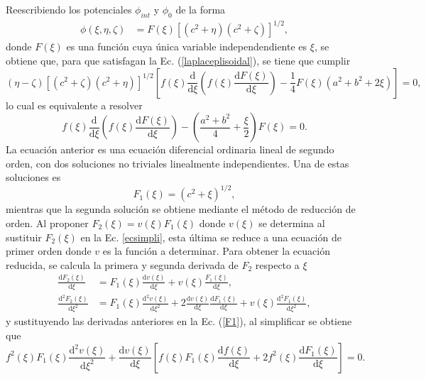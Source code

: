 Reescribiendo los potenciales $\phi_{int}$ y $\phi_0$ de la forma
\begin{align}
    \phi(\xi,\eta,\zeta)&=F(\xi)[(c^2+\eta)(c^2+\zeta)]^{1/2}, 
    \label{phi0 con F}
\end{align}
donde $F(\xi)$ es una función cuya única variable independendiente es $\xi$, se obtiene que, para que satisfagan la Ec. (\ref{laplaceplisoidal}), se tiene que cumplir 
\begin{equation}
  (\eta-\zeta)[(c^2+\zeta)(c^2+\eta)]^{1/2}\left[f(\xi)\frac{\text{d}}{\text{d}\xi}\left(f(\xi)\frac{ \text{d} F(\xi)}{\text{d}\xi}\right)-\frac{1}{4}F(\xi)(a^2+b^2+2\xi)\right]=0,
\end{equation}
lo cual es equivalente a resolver
\begin{equation}
    f(\xi)\frac{\text{d}}{\text{d}\xi}\left(f(\xi)\frac{ \text{d} F(\xi)}{\text{d}\xi}\right)-\left(\frac{a^2+b^2}{4}+\frac{\xi}{2}\right)F(\xi)=0.
    \label{ecsimpli}
\end{equation}
La ecuación anterior es una ecuación diferencial ordinaria lineal de segundo orden, con dos soluciones no triviales linealmente independientes. Una de estas soluciones es \cite{Bohren}
\begin{equation}
    F_1(\xi)=(c^2+\xi)^{1/2},
    \label{F1}
\end{equation}
mientras que la segunda solución se obtiene mediante el método de reducción de orden. Al proponer $F_2(\xi)=v(\xi)F_1(\xi)$ donde $v(\xi)$ se determina al sustituir $F_2(\xi)$ en la Ec. \ref{ecsimpli}, esta última se reduce a una ecuación de primer orden donde $v$ es la función a determinar. Para obtener la ecuación reducida, se calcula la primera y segunda derivada de $F_2$  respecto a $\xi$
\begin{align*}
    \frac{\text{d}F_2(\xi)}{\text{d}\xi}&=F_1(\xi)\frac{\text{d}v(\xi)}{\text{d}\xi}+v(\xi)\frac{F_1(\xi)}{\text{d}\xi},\\
    \frac{\text{d}^2F_2(\xi)}{\text{d}\xi^2}&=F_1(\xi)\frac{\text{d}^2v(\xi)}{\text{d}\xi^2}+2\frac{\text{d}v(\xi)}{\text{d}\xi}\frac{\text{d}F_1(\xi)}{\text{d}\xi}+v(\xi)\frac{\text{d}^2F_1(\xi)}{\text{d}\xi^2},
\end{align*}
y sustituyendo las derivadas anteriores en la Ec. (\ref{F1}), al simplificar se obtiene que
\begin{equation*}
    f^2(\xi)F_1(\xi)\frac{\text{d}^2v(\xi)}{\text{d}\xi^2}+\frac{\text{d}v(\xi)}{\text{d}\xi}\left[f(\xi)F_1(\xi)\frac{\text{d}f(\xi)}{\text{d}\xi}+2f^2(\xi)\frac{\text{d}F_1(\xi)}{\text{d}\xi}\right]=0.
\end{equation*}
